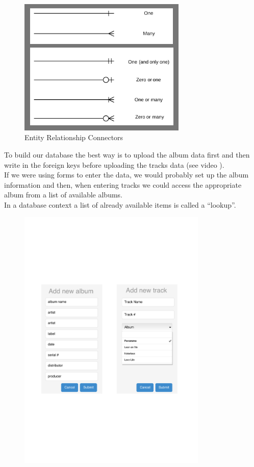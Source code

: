 \documentclass[a4paper,12pt]{article}
\begin{document}
\begin{figure}[!h]
	\centering
	\includegraphics[width=8cm]{ERD_better_opt.png}
	\caption*{Entity Relationship Connectors}
\end{figure}

To build our database the best way is to upload the album data first and then write in the foreign keys before uploading the tracks data (see video ).\\

If we were using forms to enter the data, we would probably set up the album information and then, when entering tracks we could access the appropriate album from a list of available albums.\\
In a database context a list of already available items is called a ``lookup''.\\
\begin{figure}[!h]
	\centering
	\includegraphics[width=9cm]{DataBaseDiagrams-MiniForms.pdf}
\end{figure}
\newpage
\end{document}
